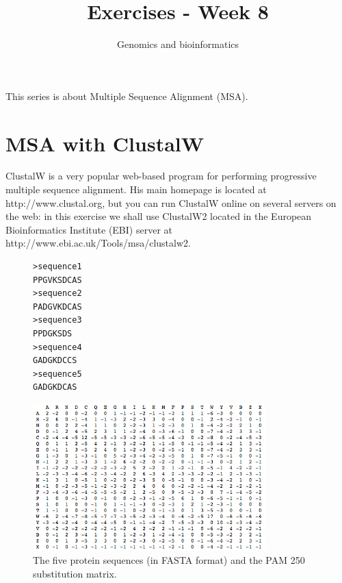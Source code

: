 \documentclass[a4paper,11pt]{article}
\title{Exercises - Week 8}
\date{}
\author{Genomics and bioinformatics}
\begin{document}
\maketitle

\noindent This series is about Multiple Sequence Alignment (MSA).

\section{MSA with ClustalW}

\noindent ClustalW is a very popular web-based program for performing progressive multiple sequence alignment. His main homepage is located at http://www.clustal.org, but you can run ClustalW online on several servers on the web: in this exercise we shall use ClustalW2 located in the European Bioinformatics Institute (EBI) server at http://www.ebi.ac.uk/Tools/msa/clustalw2. 

\vspace{10mm}

\begin{figure}[h!]
\centering
\begin{verbatim}
>sequence1
PPGVKSDCAS
>sequence2
PADGVKDCAS
>sequence3
PPDGKSDS
>sequence4
GADGKDCCS
>sequence5
GADGKDCAS
\end{verbatim}
\vspace{-60mm}\hspace{20mm}\includegraphics[width=9cm]{PAM250.png}
\caption{The five protein sequences (in FASTA format) and the PAM 250 substitution matrix.}
\end{figure}
\end{document}
